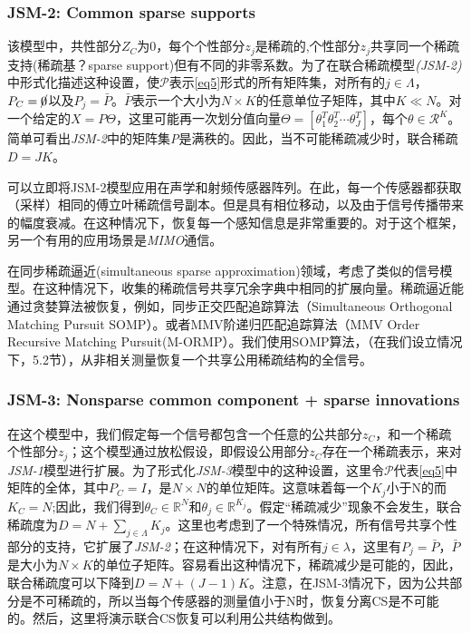 \documentclass[UTF8]{ctexart}
\theoremstyle{plain}
\theoremstyle{definition}
\theoremstyle{remark}
\newcommand{\upcite}[1]{\textsuperscript{\textsuperscript{\cite{#1}}}}
\begin{document}
	\subsubsection{JSM-2: Common sparse supports}
	该模型中，共性部分$Z_C$为0，每个个性部分$z_j$是稀疏的,个性部分${z_j}$共享同一个\textcolor[rgb]{0,0,1}{稀疏支持(稀疏基？sparse support)}但有不同的非零系数。为了在联合稀疏模型\emph{(JSM-2)}中形式化描述这种设置，使$\mathcal{P}$表示\cref{eq5}形式的所有矩阵集，对所有的$j\in\Lambda$，$P_C=\cancel{0}$以及$P_j=\bar{P}$。$\bar{P}$表示一个大小为$N \times K$的任意单位子矩阵，其中$K \ll N$。对一个给定的$X=P\Theta$，这里可能再一次划分值向量$\Theta = \left[\theta_1^T \theta_2^T \cdots \theta_J^T\right]$，每个$\theta \in \mathcal{R}^K$。简单可看出\emph{JSM-2}中的矩阵集\emph{P}是满秩的。因此，当不可能稀疏减少时，联合稀疏$D=JK$。
	
	可以立即将JSM-2模型应用在声学和射频传感器阵列。在此，每一个传感器都获取（采样）相同的傅立叶稀疏信号副本。但是具有相位移动，以及由于信号传播带来的幅度衰减。在这种情况下，恢复每一个感知信息是非常重要的。对于这个框架，另一个有用的应用场景是\emph{MIMO}通信\upcite{Tropp2005}。
	
	在同步稀疏逼近(\textcolor[rgb]{1,0,0}{simultaneous sparse approximation})领域，考虑了类似的信号模型\upcite{Tropp2005,Temlyakov2004,Cotter2005}。在这种情况下，收集的稀疏信号共享冗余字典中相同的扩展向量。稀疏逼近能通过贪婪算法被恢复，例如，同步正交匹配追踪算法（\textcolor[rgb]{1,0,0}{Simultaneous Orthogonal Matching Pursuit SOMP）}\upcite{Tropp2005,Temlyakov2004}。或者MMV阶递归匹配追踪算法（\textcolor[rgb]{1,0,0}{MMV Order Recursive Matching Pursuit(M-ORMP）}\upcite{Cotter2005}。我们使用SOMP算法，（在我们设立情况下，5.2节），从非相关测量恢复一个共享公用稀疏结构的全信号。
	
	\subsubsection{JSM-3: Nonsparse common component + sparse innovations}
	在这个模型中，我们假定每一个信号都包含一个任意的公共部分$z_C$，和一个稀疏个性部分$z_j$；这个模型通过放松假设，即假设公用部分$z_C$存在一个稀疏表示，来对\emph{JSM-1}模型进行扩展。为了形式化\emph{JSM-3}模型中的这种设置，这里令$\mathcal{P}$代表\cref{eq5}中矩阵的全体，其中$P_C=I$，是$N \times N$的单位矩阵。这意味着每一个$K_j$小于N的而$K_C=N$;因此，我们得到$\theta_C \in \mathbb{R}^N$和$\theta_j \in \mathbb{R}^{K_j}$。假定“稀疏减少”现象不会发生，联合稀疏度为$D=N+\sum_{j \in \Lambda}K_j$。这里也考虑到了一个特殊情况，\textcolor[rgb]{0,0,1}{所有信号共享个性部分的支持}，它扩展了\emph{JSM-2}；在这种情况下，对有所有$j \in \lambda$，这里有$P_j=\bar{P}$，$\bar{P}$是大小为$N \times K$的单位子矩阵。容易看出这种情况下，稀疏减少是可能的，因此，联合稀疏度可以下降到$D=N+(J-1)K$。注意，在JSM-3情况下，因为公共部分是不可稀疏的，所以当每个传感器的测量值小于N时，恢复分离CS是不可能的。然后，这里将演示联合CS恢复可以利用公共结构做到。
	
\end{document}
